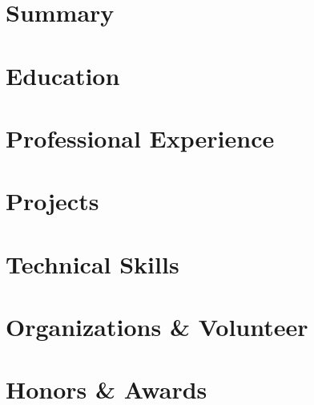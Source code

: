 \documentclass[a4paper,11pt]{paper}
\begin{document}
\begin{center}
    
\end{center}

\section{Summary}
\noindent


\section{Education}


\section{Professional Experience}


\section{Projects}


\section{Technical Skills}


\section{Organizations \& Volunteer}


\section{Honors \& Awards}

\end{document}
